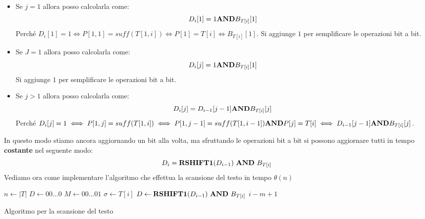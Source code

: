 \begin{itemize}
    \item Se $j =  1$ allora posso calcolarla come:
    \begin{equation}
        D_i[1] = 1 \text{\textbf{AND}} B_{T[i]}[1]
    \end{equation}
    Perché $D_i[1] = 1\iff P[1,1] =suff(T[1,i])\iff P[1] = T[i]\iff B_{T[i]}[1]$.
    Si aggiunge $1$ per semplificare le operazioni bit a bit. 
    \item Se $J =  1$ allora posso calcolarla come:
          \begin{equation}
              D_i[j] = 1 \text{\textbf{AND}} B_{T[i]}[1]
          \end{equation}
          Si aggiunge $1$ per semplificare le operazioni bit a bit.
    \item Se $j > 1$ allora posso calcolarla come:
    \begin{equation}
        D_i[j] = D_{i - 1}[j - 1] \text{\textbf{AND}} B_{T[i]}[j]
    \end{equation}
    Perché $D_i[j] = 1 \iff P[1,j] = suff(T[1,i]) \iff P[1,j-1] = suff(T[1,i-1])
     \text{\textbf{AND}} P[j] = T[i] \iff D_{i-1}[j-1] \text{\textbf{AND}} B_{T[i]}[j]$.
\end{itemize}
In questo modo stiamo ancora aggiornando un bit alla volta, ma sfruttando le 
operazioni bit a bit si possono aggiornare tutti in tempo \textbf{costante} nel seguente modo:
\begin{equation}
    D_i = \text{\textbf{RSHIFT1}}(D_{i - 1}) \ \text{\textbf{AND}} \ B_{T[i]}
\end{equation}
Vediamo ora come implementare l'algoritmo che effettua la scansione del testo in tempo $\theta(n)$
\begin{algorithm}
    \begin{algorithmic}
        \State $n \gets |T|$
        \State $D \gets 00\dots0$
        \State $M \gets 00\dots01$
        \State $\sigma \gets T[i]$
        \State $D \gets \text{\textbf{RSHIFT1}}(D_{i - 1}) \ \text{\textbf{AND}} \ B_{T[i]}$
        \State {} $i - m + 1$
        \EndIf
        \EndFor
        \EndFunction
    \end{algorithmic}
    \caption{Algoritmo per la scansione del testo}
\end{algorithm}


